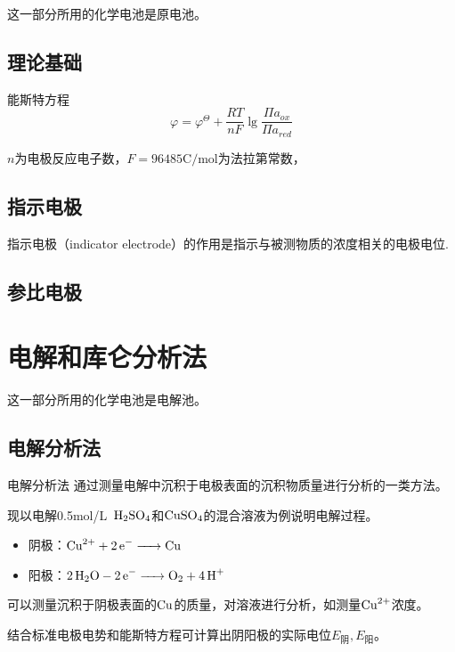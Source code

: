 这一部分所用的化学电池是原电池。

\subsection{理论基础}
能斯特方程
\begin{equation*}
	\varphi=\varphi^{\Theta}+\dfrac{RT}{nF}\lg \dfrac{\Pi a_{ox}}{\Pi a_{red}}
\end{equation*}

$n$为电极反应电子数，$F=96485\mathrm{C/mol}$为法拉第常数，

\subsection{指示电极}
指示电极（indicator electrode）的作用是指示与被测物质的浓度相关的电极电位.


\subsection{参比电极}


\section{电解和库仑分析法}

这一部分所用的化学电池是电解池。

\subsection{电解分析法}
\begin{definition*}{电解分析法}{}
	通过测量电解中沉积于电极表面的沉积物质量进行分析的一类方法。
\end{definition*}

\begin{example}
	现以电解0.5mol/L\ $\ce{H2SO4}$和$\ce{CuSO4}$的混合溶液为例说明电解过程。
	
	\begin{itemize}
		\item 阴极：$\ce{Cu^2+ + 2e- -> Cu}$
		\item 阳极：$\ce{2H2O - 2e- -> O2 + 4H+}$
	\end{itemize}

	可以测量沉积于阴极表面的$\ce{Cu}$的质量，对溶液进行分析，如测量$\ce{Cu^2+}$浓度。
\end{example}

结合标准电极电势和能斯特方程可计算出阴阳极的实际电位$E_{\text{阴}},E_{\text{阳}}$。

